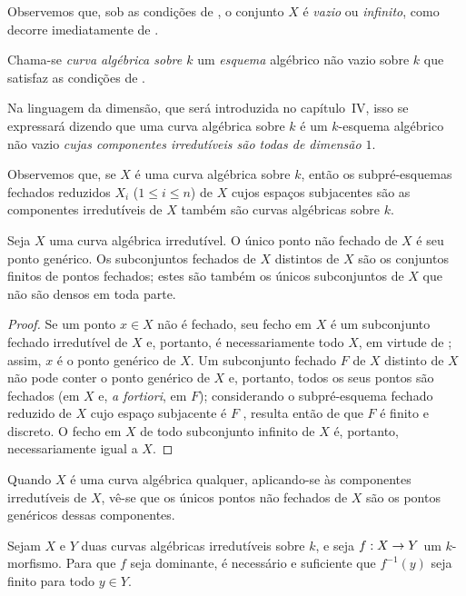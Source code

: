 \documentclass[oneside,10pt]{amsart}
\makeatletter
\renewcommand{\leq}{\leqslant}
\newcommand{\ega@arrow}[2]{\mathchoice{#1}{#2}{#2}{#2}}
\renewcommand{\to}{\ega@arrow{\longrightarrow}{\rightarrow}}
\newcommand{\oldpage}[2][]{\marginnote{\normalfont\footnotesize\textbf{#1}~|~#2}\ignorespaces}
\let\EGAOriginalLabel\label
\renewcommand{\label}[1]{\phantomsection\EGAOriginalLabel{#1}}
\makeatother
\begin{document}
Observemos que, sob as condições de , o conjunto $X$ é \emph{vazio} ou \emph{infinito}, como decorre imediatamente de .

\begin{definition}[7.4.2]
\label{II.7.4.2}
Chama-se \emph{curva algébrica sobre $k$} um \emph{esquema} algébrico não vazio sobre $k$ que satisfaz as condições de .
\end{definition}

Na linguagem da dimensão, que será introduzida no capítulo~IV, isso se expressará dizendo que uma curva algébrica sobre $k$ é um $k$-esquema algébrico não vazio \emph{cujas componentes irredutíveis são todas de dimensão $1$}.

Observemos que, se $X$ é uma curva algébrica sobre $k$, então os subpré-esquemas fechados reduzidos $X_i$ ($1\leq i\leq n$) de $X$ cujos espaços subjacentes são as componentes irredutíveis de $X$ também são curvas algébricas sobre $k$.

\begin{corollary}[7.4.3]
\label{II.7.4.3}
Seja $X$ uma curva algébrica irredutível.
O único ponto não fechado de $X$ é seu ponto genérico.
Os subconjuntos fechados de $X$ distintos de $X$ são os conjuntos finitos de pontos fechados;
estes são também os únicos subconjuntos de $X$ que não são densos em toda parte.
\end{corollary}

\begin{proof}
Se um ponto $x\in X$ não é fechado, seu fecho em $X$ é um subconjunto fechado irredutível de $X$ e, portanto, é necessariamente todo $X$, em virtude de ; assim, $x$ é o ponto genérico de $X$.
Um subconjunto fechado $F$ de $X$ distinto de $X$ não pode conter
\oldpage[II]{149}
o ponto genérico de $X$ e, portanto, todos os seus pontos são fechados (em $X$ e, \emph{a fortiori}, em $F$);
considerando o subpré-esquema fechado reduzido de $X$ cujo espaço subjacente é $F$ , resulta então de  que $F$ é finito e discreto.
O fecho em $X$ de todo subconjunto infinito de $X$ é, portanto, necessariamente igual a $X$.
\end{proof}

Quando $X$ é uma curva algébrica qualquer, aplicando-se  às componentes irredutíveis de $X$, vê-se que os únicos pontos não fechados de $X$ são os pontos genéricos dessas componentes.

\begin{corollary}[7.4.4]
\label{II.7.4.4}
Sejam $X$ e $Y$ duas curvas algébricas irredutíveis sobre $k$, e seja $f:X\to Y$ um $k$-morfismo.
Para que $f$ seja dominante, é necessário e suficiente que $f^{-1}(y)$ seja finito para todo $y\in Y$.
\end{corollary}
\end{document}
